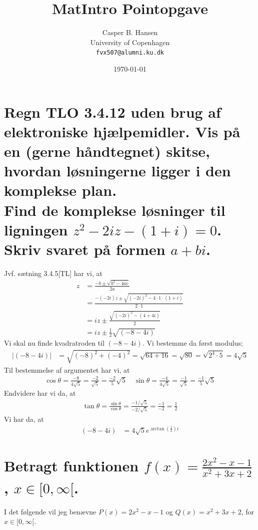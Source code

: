 \documentclass[11pt,a4paper]{article}
\title{MatIntro Pointopgave \assignmentnumber}
\author
{
    Casper B. Hansen\\
    University of Copenhagen\\
    {\tt fvx507@alumni.ku.dk}
}
\date{\today}
\newcommand{\modulus}[1]{\lvert#1\rvert}
\begin{document}


\section
{
    \mdseries
    Regn TLO 3.4.12 uden brug af elektroniske hjælpemidler. Vis på en (gerne
    håndtegnet) skitse, hvordan løsningerne ligger i den komplekse plan.
    \\\indent
    Find de komplekse løsninger til ligningen $z^2 - 2iz - (1 + i) = 0$.
    Skriv svaret på formen $a + bi$.
}
Jvf. sætning 3.4.5[TL] har vi, at
\begin{align}
    z &= \frac{-b \pm \sqrt{b^2 - 4ac}}{2a} \\
      &= \frac{-(-2i)z \pm \sqrt{(-2i)^2 - 4 \cdot 1 \cdot (1 + i)}}{2 \cdot 1} \\
      &= iz \pm \frac{\sqrt{(-2i)^2 - (4 + 4i)}}{2} \\
      &= iz \pm \frac{1}{2} \sqrt{(-8 - 4i)}
\end{align}
Vi skal nu finde kvadratroden til $(-8 - 4i)$. Vi bestemme da først modulus;
\begin{align}
    \modulus{(-8 - 4i)} &= \sqrt{(-8)^2 + (-4)^2}
                         = \sqrt{64 + 16}
                         = \sqrt{80}
                         = \sqrt{2^4 \cdot 5}
                         = 4 \sqrt{5}
\end{align}
Til bestemmelse af argumentet har vi, at
\begin{align}
    \cos \theta = \frac{-8}{4 \sqrt{5}}
                = \frac{-2}{\sqrt{5}}
                = \frac{-2}{5} \sqrt{5}
    \quad
    \sin \theta = \frac{-4}{4 \sqrt{5}}
                = \frac{-1}{\sqrt{5}}
                = \frac{-1}{5} \sqrt{5}
\end{align}
Endvidere har vi da, at
\begin{align}
    \tan \theta = \frac{\sin \theta}{\cos \theta}
                = \frac{-1 / \sqrt{5}}{-2 / \sqrt{5}}
                = \frac{-1}{-2}
                = \frac{1}{2}
\end{align}
Vi har da, at
\begin{align}
    (-8 - 4i) &= 4 \sqrt{5} e^{\arctan(\frac{1}{2}) i}
\end{align}

\section
{
    \mdseries
    Betragt funktionen $f(x) = \frac{2x^2 - x - 1}{x^2 + 3x + 2}$, $x \in
    [0,\infty[$.
}
I det følgende vil jeg benævne $P(x) = 2x^2 - x - 1$ og
$Q(x) = x^2 + 3x + 2$, for $x \in [0,\infty[$.
\end{document}
